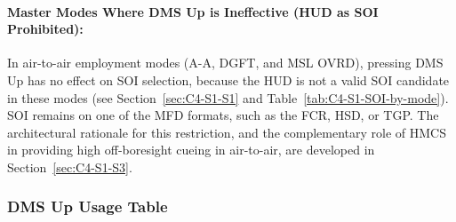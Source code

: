 \documentclass[11pt,a4paper]{article}
\begin{document}
\paragraph*{Master Modes Where DMS Up is Ineffective (HUD as SOI Prohibited):}


In air-to-air employment modes (A-A, DGFT, and MSL OVRD), pressing DMS Up has no effect on SOI selection, because the HUD is not a valid SOI candidate in these modes (see Section~\ref{sec:C4-S1-S1} and Table~\ref{tab:C4-S1-SOI-by-mode}). SOI remains on one of the MFD formats, such as the FCR, HSD, or TGP. The architectural rationale for this restriction, and the complementary role of HMCS in providing high off-boresight cueing in air-to-air, are developed in Section~\ref{sec:C4-S1-S3}.

\subsubsection{DMS Up Usage Table}
\label{sec:C4-S2-S2}

\end{document}
